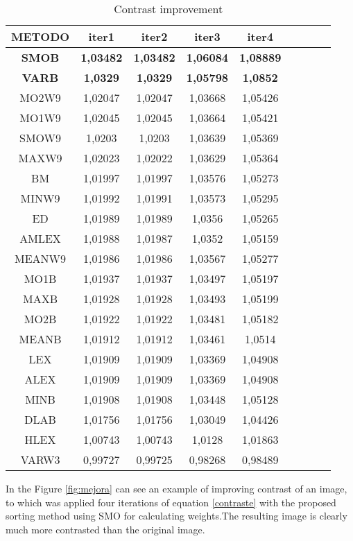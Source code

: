 \begin{table}
\caption{Contrast improvement}
\label{tab:EXP_N1}
\begin{tabular}{ccccccccc}
\hline METODO& iter1&iter2&iter3&iter4\\
\hline  \textbf{SMOB}& \textbf{1,03482}& \textbf{1,03482}& \textbf{1,06084}& \textbf{1,08889}\\
\hline  \textbf{VARB}& \textbf{1,0329}& \textbf{1,0329}& \textbf{1,05798}& \textbf{1,0852}\\
\hline MO2W9&1,02047&1,02047&1,03668&1,05426\\
\hline MO1W9&1,02045&1,02045&1,03664&1,05421\\
\hline SMOW9&1,0203&1,0203&1,03639&1,05369\\
\hline MAXW9&1,02023&1,02022&1,03629&1,05364\\
\hline BM&1,01997&1,01997&1,03576&1,05273\\
\hline MINW9&1,01992&1,01991&1,03573&1,05295\\
\hline ED&1,01989&1,01989&1,0356&1,05265\\
\hline AMLEX&1,01988&1,01987&1,0352&1,05159\\
\hline MEANW9&1,01986&1,01986&1,03567&1,05277\\
\hline MO1B&1,01937&1,01937&1,03497&1,05197\\
\hline MAXB&1,01928&1,01928&1,03493&1,05199\\
\hline MO2B&1,01922&1,01922&1,03481&1,05182\\
\hline MEANB&1,01912&1,01912&1,03461&1,0514\\
\hline LEX&1,01909&1,01909&1,03369&1,04908\\
\hline ALEX&1,01909&1,01909&1,03369&1,04908\\
\hline MINB&1,01908&1,01908&1,03448&1,05128\\
\hline DLAB&1,01756&1,01756&1,03049&1,04426\\
\hline HLEX&1,00743&1,00743&1,0128&1,01863\\
\hline VARW3&0,99727&0,99725&0,98268&0,98489\\

\hline

\end{tabular}
\end{table}

In the Figure \ref{fig:mejora} can see an example of improving contrast of an image, to which was applied four iterations of equation \ref{contraste} with the proposed sorting method using SMO for calculating weights.The resulting image is clearly much more contrasted than the original image. 
 
